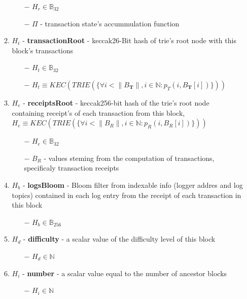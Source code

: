 \documentclass{article}
\begin{document}
\begin{enumerate}
\begin{enumerate}
        \begin{enumerate}
            \item[$-$] $H_r \in \mathbb{B}_{32}$
            \item[$-$] $\Pi$ - transaction state's accummulation function
        \end{enumerate}
        \item $H_t$ - \textbf{transactionRoot} - keccak26-Bit hash of trie's root node with this block's transactions
        \begin{enumerate}
            \item[$-$] $H_t \in \mathbb{B}_{32}$
            \item[$-$] $H_t \equiv KEC(TRIE(\{\forall i < \| B_{\textbf{T}} \|, i \in \mathbb{N} : p_T(i, B_{\textbf{T}}[i])\}))$
        \end{enumerate}
        \item $H_e$ - \textbf{receiptsRoot} - keccak256-bit hash of the trie's root node containing receipt's of each transaction from this block, $H_e \equiv KEC(TRIE(\{\forall i< \|B_R\|, i \in \mathbb{N} :  p_R(i, B_R[i])\}))$
        \begin{enumerate}
            \item[$-$] $H_e \in \mathbb{B}_{32}$
            \item[$-$] $B_R$ - values steming from the computation of transactions, specificaly transaction receipts
        \end{enumerate}
        \item $H_b$ - \textbf{logsBloom} - Bloom filter from indexable info (logger addres and log topics) contained in each log entry from the receipt of each transaction in this block
        \begin{enumerate}
            \item[$-$] $H_b \in \mathbb{B}_{256}$
        \end{enumerate}
        \item $H_d$ - \textbf{difficulty} - a scalar value of the difficulty level of this block
        \begin{enumerate}
            \item[$-$] $H_d \in \mathbb{N}$
        \end{enumerate}
        \item $H_i$ - \textbf{number} - a scalar value equal to the number of ancestor blocks
        \begin{enumerate}
            \item[$-$] $H_i \in \mathbb{N}$

\end{enumerate}
\end{enumerate}
\end{enumerate}
\end{document}
